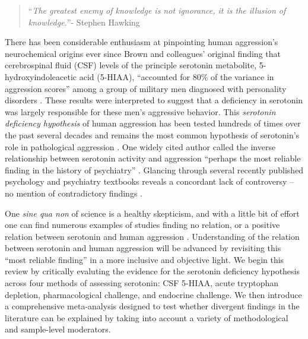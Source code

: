 % 
% 


\begin{quotation}\noindent
``\emph{The greatest enemy of knowledge is not ignorance, it is the illusion of knowledge.}''- Stephen Hawking
\end{quotation}


There has been considerable enthusiasm at pinpointing human aggression's neurochemical origins ever since Brown and colleagues' original finding that cerebrospinal fluid (CSF) levels of the principle serotonin metabolite, 5-hydroxyindoleacetic acid (5-HIAA), ``accounted for 80\% of the variance in aggression scores'' among a group of military men diagnosed with personality disorders  \parencite[133]{Brown79}. These results were interpreted to suggest that a deficiency in serotonin was largely responsible for these men's aggressive behavior. This \emph{serotonin deficiency hypothesis} of human aggression has been tested hundreds of times over the past several decades and remains the most common hypothesis of serotonin's role in pathological aggression \parencite[e.g.,][]{Montoya2011, Passamonti2012, Raine2008, Stadler2007, Steiger2004, Yanowitch2011}. One widely cited author called the inverse relationship between serotonin activity and aggression ``perhaps the most reliable finding in the history of psychiatry'' \parencite[15]{Fishbein2001}. Glancing through several recently published psychology and psychiatry textbooks reveals a concordant lack of controversy -- no mention of contradictory findings \parencite[e.g.,][]{Bushman2010f, Carlson2010, Higley2007, Hollander2008}.


One \emph{sine qua non} of science is a healthy skepticism, and with a little bit of effort one can find numerous examples of studies finding no relation, or a positive relation between serotonin and human aggression \parencite[e.g.,][]{Booij2010, Castellanos1994, Gardner1990, Germine1992, Handelsman1998, Koszycki1996, Lopez1996, Tuinier96, Wood2006}. Understanding of the relation between serotonin and human aggression will be advanced by revisiting this ``most reliable finding'' in a more inclusive and objective light. We begin this review by critically evaluting the evidence for the serotonin deficiency hypothesis across four methods of assessing serotonin: CSF 5-HIAA, acute tryptophan depletion,  pharmacological challenge, and endocrine challenge. We then introduce a comprehensive meta-analysis designed to test whether divergent findings in the literature can be explained by taking into account a variety of methodological and sample-level moderators. 


